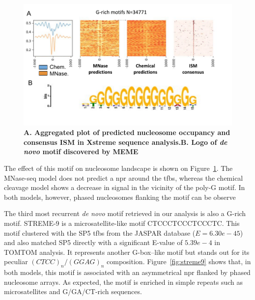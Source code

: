 \documentclass[11pt]{book}
\begin{document}
\begin{figure}[htbp]
    \centering
    \includegraphics[width=\textwidth]{Figures/Results/G-rich motifs.pdf}
    \caption{\textbf{A. Aggregated plot of predicted nucleosome occupancy and consensus ISM in Xstreme sequence analysis.}\textbf{B. Logo of \textit{de novo} motif discovered by MEME}}
    \label{fig:grich_xstreme}
\end{figure}

The effect of this motif on nucleosome landscape is shown on Figure~\ref{fig:grich_xstreme}. The MNase-seq model does not predict a \gls{npr} around the \gls{tfbs}, whereas the chemical cleavage model shows a decrease in signal in the vicinity of the poly-G motif. In both models, however, phased nucleosomes flanking the motif can be observe

\FloatBarrier
The third most recurrent \textit{de novo} motif retrieved in our analysis is also a G-rich motif. STREME-9 is a microsatellite-like motif $\text{CTCCCTCCCTCCCTC}$. This motif clustered with the SP5 \gls{tfbs} from the JASPAR database ($E=6.30e-45$) and also matched SP5 directly with a significant E-value of $5.39e-4$ in TOMTOM analysis. It represents another G-box–like motif but stands out for its peculiar $(CTCC)_n/(GGAG)_n$ composition. Figure~\ref{fig:streme9} shows that, in both models, this motif is associated with an asymmetrical \gls{npr} flanked by phased nucleosome arrays. As expected, the motif is enriched in simple repeats such as microsatellites and G/GA/CT-rich sequences.
\end{document}
